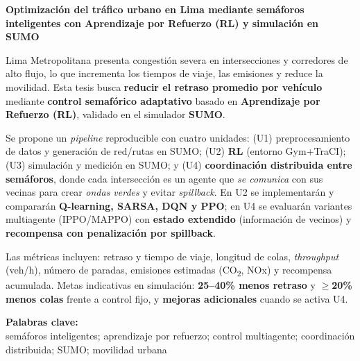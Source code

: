 
\begin{center}
\large \vspace{-1.5cm} \textbf{Optimización del tráfico urbano en Lima mediante semáforos inteligentes con Aprendizaje por Refuerzo (RL) y simulación en SUMO}
\end{center}

Lima Metropolitana presenta congestión severa en intersecciones y corredores de alto flujo, lo que incrementa los tiempos de viaje, las emisiones y reduce la movilidad. Esta tesis busca \textbf{reducir el retraso promedio por vehículo} mediante \textbf{control semafórico adaptativo} basado en \textbf{Aprendizaje por Refuerzo (RL)}, validado en el simulador \textbf{SUMO}.

Se propone un \textit{pipeline} reproducible con cuatro unidades: (U1) preprocesamiento de datos y generación de red/rutas en SUMO; (U2) \textbf{RL} (entorno Gym+TraCI); (U3) simulación y medición en SUMO; y (U4) \textbf{coordinación distribuida entre semáforos}, donde cada intersección es un agente que \textit{se comunica} con sus vecinas para crear \textit{ondas verdes} y evitar \textit{spillback}. En U2 se implementarán y compararán \textbf{Q-learning, SARSA, DQN y PPO}; en U4 se evaluarán variantes multiagente (IPPO/MAPPO) con \textbf{estado extendido} (información de vecinos) y \textbf{recompensa con penalización por spillback}.

Las métricas incluyen: retraso y tiempo de viaje, longitud de colas, \textit{throughput} (veh/h), número de paradas, emisiones estimadas (CO\textsubscript{2}, NOx) y recompensa acumulada. Metas indicativas en simulación: \textbf{25–40\% menos retraso} y \textbf{$\geq$20\% menos colas} frente a control fijo, y \textbf{mejoras adicionales} cuando se activa U4.

\noindent \textbf{Palabras clave:}\\
\noindent semáforos inteligentes; aprendizaje por refuerzo; control multiagente; coordinación distribuida; SUMO; movilidad urbana
